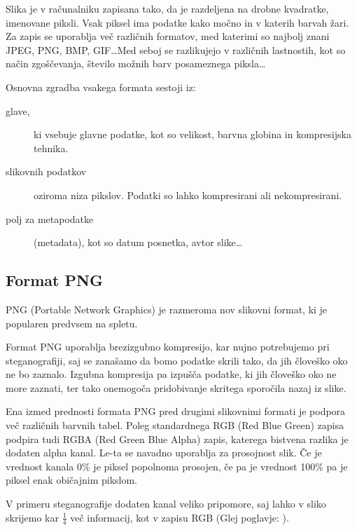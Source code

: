 \label{zapisslik}
Slika je v računalniku zapisana tako, da je razdeljena na drobne kvadratke, imenovane piksli. Vsak piksel ima podatke kako močno in v katerih barvah žari. Za zapis se uporablja več različnih formatov, med katerimi so najbolj znani JPEG, PNG, BMP, GIF\ldots Med seboj se razlikujejo v različnih lastnostih, kot so način zgoščevanja, število možnih barv posameznega piksla\ldots

Osnovna zgradba vsakega formata sestoji iz:
\begin{description}
    \item [glave,] ki vsebuje glavne podatke, kot so velikost, barvna globina in kompresijska tehnika. 
    \item [slikovnih podatkov] oziroma niza pikslov. Podatki so lahko kompresirani ali nekompresirani.
    \item [polj za metapodatke] (metadata), kot so datum posnetka, avtor slike\ldots
\end{description} 

\subsection{Format PNG}
    PNG (Portable Network Graphics) je razmeroma nov slikovni format, ki je popularen predvsem na spletu.

    Format PNG uporablja brezizgubno kompresijo, kar nujno potrebujemo pri steganografiji, saj se zanašamo da bomo podatke skrili tako, da jih človeško oko ne bo zaznalo. Izgubna kompresija pa izpušča podatke, ki jih človeško oko ne more zaznati, ter tako onemogoča pridobivanje skritega sporočila nazaj iz slike.

    Ena izmed prednosti formata PNG pred drugimi slikovnimi formati je podpora več različnih barvnih tabel. Poleg standardnega RGB (Red Blue Green) zapisa podpira tudi RGBA (Red Green Blue Alpha) zapis, katerega bistvena razlika je dodaten alpha kanal. Le-ta se navadno uporablja za prosojnost slik. Če je vrednost kanala 0\% je piksel popolnoma prosojen, če pa je vrednost 100\% pa je piksel enak običajnim pikslom.

    V primeru steganografije dodaten kanal veliko pripomore, saj lahko v sliko skrijemo kar $\frac{1}{4}$ več informacij, kot v zapisu RGB (Glej poglavje: ).